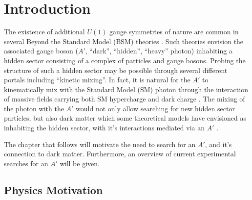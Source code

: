 \chapter{Introduction}

The existence of additional $U(1)$ gauge symmetries of nature are common in
several Beyond the Standard Model (BSM) theories \cite{goodsell2010, 
candelas1985, andreas2013, jaeckel2010}. Such theories envision the associated
gauge boson ($A'$, ``dark'', ``hidden'', ``heavy'' photon) inhabiting a hidden sector
consisting of a complex of particles and gauge bosons.  Probing the 
structure of such a hidden sector may be possible through several different portals
including ``kinetic mixing''.  In fact, it is natural for the $A'$ to 
kinematically mix with the Standard Model (SM) photon through the interaction
of massive fields carrying both SM hypercharge and dark charge \cite{holdom1986}.
The mixing of the photon with the $A'$ would not only allow searching for
new hidden sector particles, but also dark matter which some theoretical models
have envisioned as inhabiting the hidden sector, with it's interactions mediated
via an $A'$ \cite{arkani-hamed2009, pospelov2009, cheung2009, arkani-hamed2008}.

The chapter that follows will motivate the need to search for an $A'$, and it's
connection to dark matter.  Furthermore, an overview of current experimental 
searches for an $A'$ will be given.

\section{Physics Motivation}

